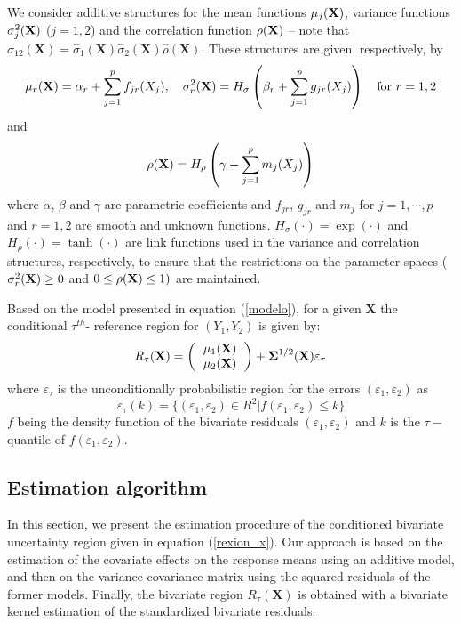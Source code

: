 We consider additive structures for the mean functions $\mu_j({\bf X})$, variance functions $\sigma_j^2({\bf X})$ ($j=1,2$) and the correlation function $\rho({\bf X})$ -- note that $\sigma_{12} (\textbf{X})= \hat \sigma_1(\textbf{X}) \hat \sigma_{2} (\textbf{X}) \hat \rho (\textbf{X})$. These structures are given, respectively, by 
\[
\mu_r({\bf X})=\alpha_r + \sum_{j=1}^p{f_{jr}(X_j)}, \quad
\sigma_r^2({\bf X})=H_\sigma\left({\beta_r+ \sum_{j=1}^p{g_{jr}(X_j)}}\right) \quad \text{for } r=1,2
\]
\noindent
and 
\[
\rho({\bf X}) =H_\rho \left({\gamma+ \sum_{j=1}^p{m_{j}(X_j)}}\right)
\]
\noindent
where $\alpha$, $\beta$ and $\gamma$ are parametric coefficients and  $f_{jr}$,  $g_{jr}$ and $m_j$  for $j = 1,\cdots,p$ and $r=1,2$ are smooth and unknown functions. $H_\sigma (\cdot)=\exp(\cdot)$ and  $H_\rho(\cdot)=\tanh(\cdot)$ are link functions used in the variance and correlation structures, respectively, to ensure that the restrictions on the parameter spaces ($\sigma_r^2({\bf X}) \geq 0$ and $0\leq \rho({\bf X}) \leq 1) $ are maintained. 

Based on the model presented in equation (\ref{modelo}), for a given $\textbf{X}$ the conditional $\tau^{th}$- reference region for  $(Y_1, Y_2)$ is given by:
\begin{equation}
R_{\tau}(\textbf{X})
=
\left( {
	\begin{tabular} {c}
	$\mu_1(\textbf{X})$ \\
	$\mu_2(\textbf{X})$\
	\end{tabular}
}\right)
+ 
\boldsymbol{\Sigma}^{1/2} (\textbf{X}) \varepsilon_{\tau}
\label{rexion_x}
\end{equation} 
\noindent where $\varepsilon_{\tau}$ is the unconditionally probabilistic region for the errors $(\varepsilon_1,\varepsilon_2)$ as 
\begin{equation}
\varepsilon_{\tau} (k) = \{(\varepsilon_1,\varepsilon_2) \in{R}^2 | f(\varepsilon_1,\varepsilon_2) \leq k\}
\label{rexion1}
\end{equation}
\noindent
$f$ being the density function of the bivariate residuals  $(\varepsilon_1,\varepsilon_2)$ and  $k$ is the $\tau-$quantile of $f(\varepsilon_1,\varepsilon_2)$. 


\subsection{Estimation algorithm}

In this section, we present the estimation procedure of the conditioned bivariate uncertainty region given in equation (\ref{rexion_x}). Our approach is based on the estimation of the covariate effects on the response means using an additive model, and then on the variance-covariance matrix using the squared residuals of the former models. Finally, the bivariate region $R_{\tau}(\textbf{X})$ is obtained with a bivariate kernel estimation of the standardized bivariate residuals. 

